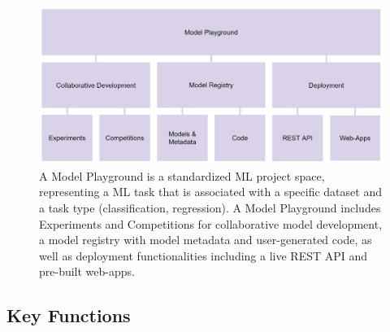 \begin{figure}
  \centering
  \includegraphics[width=1\textwidth]{figures/fig_overview.png}
  \caption{A Model Playground is a standardized ML project space, representing a ML task that is associated with a specific dataset and a task type (classification, regression). A Model Playground includes Experiments and Competitions for collaborative model development, a model registry with model metadata and user-generated code, as well as deployment functionalities including a live REST API and pre-built web-apps.}
  \label{fig:fig_overview}
\end{figure}


\subsection{Key Functions}
